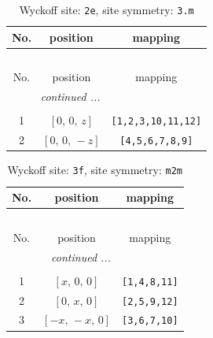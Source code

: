 \documentclass[fleqn,8pt]{jsarticle}
\begin{document}
\begin{longtable}{ccc}
\caption{Wyckoff site: {\tt 2e}, site symmetry: {\tt 3.m}}
 \\
 \hline \hline
No. & position & mapping \\ \hline \endfirsthead

\multicolumn{2}{l}{\tablename\ \thetable{}} \\
 \hline \hline
No. & position & mapping \\ \hline \endhead

 \hline \hline
\multicolumn{2}{r}{\footnotesize\it continued ...} \\ \endfoot

 \hline \hline
\multicolumn{2}{r}{} \\ \endlastfoot

1 & $\left[ 0,\, 0,\, z \right]$ & {\tt [1,2,3,10,11,12]} \\ \hline
2 & $\left[ 0,\, 0,\, - z \right]$ & {\tt [4,5,6,7,8,9]} \\
\end{longtable}
\renewcommand{\arraystretch}{1.2}
\begin{longtable}{ccc}
\caption{Wyckoff site: {\tt 3f}, site symmetry: {\tt m2m}}
 \\
 \hline \hline
No. & position & mapping \\ \hline \endfirsthead

\multicolumn{2}{l}{\tablename\ \thetable{}} \\
 \hline \hline
No. & position & mapping \\ \hline \endhead

 \hline \hline
\multicolumn{2}{r}{\footnotesize\it continued ...} \\ \endfoot

 \hline \hline
\multicolumn{2}{r}{} \\ \endlastfoot

1 & $\left[ x,\, 0,\, 0 \right]$ & {\tt [1,4,8,11]} \\ \hline
2 & $\left[ 0,\, x,\, 0 \right]$ & {\tt [2,5,9,12]} \\ \hline
3 & $\left[ - x,\, - x,\, 0 \right]$ & {\tt [3,6,7,10]} \\
\end{longtable}
\renewcommand{\arraystretch}{1.2}
\end{document}
